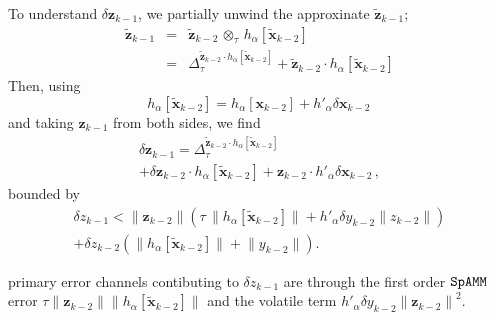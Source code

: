 \documentclass[letterpaper,twocolumn,amsmath,amsfont,amssymb,english,aps,jcp,preprintnumbers,groupaddress,nofootinbib,tightenlines,floatfix]{revtex4}
\newcommand{\mat}[1]{\boldsymbol{#1}}
\newcommand{\ot}{  {\scriptstyle \otimes}_{ \tau } }
\theoremstyle{plain}
\theoremstyle{remark}
\theoremstyle{plain}
\begin{document}
To understand $\delta \mat{z}_{k-1}$, we partially unwind the approxinate  $\widetilde{\mat{z}}_{k-1}$;
\begin{eqnarray} \label{widetildez}
 \widetilde{\mat{z}}_{k-1} &=&  \widetilde{\mat{z}}_{k-2}  \, \ot \, h_\alpha[\widetilde{\mat{x}}_{k-2}]\\
&=& \Delta^{\widetilde{\mat{z}}_{k-2} \cdot h_\alpha \left[ \widetilde{\mat{x}}_{k-2}\right]}_\tau
+ \widetilde{\mat{z}}_{k-2} \cdot h_\alpha\left[ \widetilde{\mat{x}}_{k-2}\right]
\end{eqnarray}
Then, using
\begin{equation}
  h_\alpha \left[ \widetilde{\mat{x}}_{k-2} \right]
=  h_\alpha \left[ \mat{x}_{k-2} \right] +  h'_\alpha  \delta \mat{x}_{k-2} \, 
\end{equation}
and taking $\mat{z}_{k-1}$ from both sides, we find  
\begin{multline}
 \delta {\mat{z}}_{k-1} =\Delta^{\widetilde{\mat{z}}_{k-2} \cdot h_\alpha \left[ \widetilde{\mat{x}}_{k-2}\right]}_\tau
\\ +\delta \mat{z}_{k-2} \cdot h_\alpha \left[\widetilde{\mat{x}}_{k-2} \right]
+ \mat{z}_{k-2} \cdot h'_\alpha \delta \mat{x}_{k-2}  \, ,
\end{multline}
bounded by 
 \begin{multline}
  \delta {z}_{k-1} <
 \lVert \mat{z}_{k-2} \rVert \left( \tau \, \lVert h_\alpha \left[\widetilde{\mat{x}}_{k-2} \right]  \rVert
 + h'_\alpha  \delta y_{k-2} \lVert z_{k-2} \rVert \right)  \\ 
 + \delta {z}_{k-2} \left( \lVert h_\alpha \left[\widetilde{\mat{x}}_{k-2}  \right] \rVert  + \lVert y_{k-2} \rVert \right) .
 \end{multline}


primary error channels contibuting to $\delta z_{k-1}$ are through the first order $\tt SpAMM$ error
$ \tau \lVert \mat{z}_{k-2} \rVert \lVert h_\alpha \left[\widetilde{\mat{x}}_{k-2} \right]\rVert$
and the volatile term $h'_\alpha  \delta y_{k-2} { \lVert \mat{z}_{k-2} \rVert }^2$.
\end{document}
